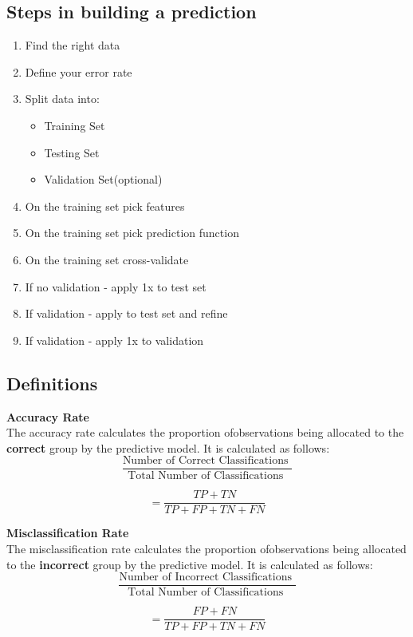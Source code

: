 \documentclass[caret-main.tex]{subfiles}
\begin{document}
\subsection*{Steps in building a prediction}
\begin{enumerate}
\item Find the right data
\item Define your error rate
\item Split data into:
\begin{itemize}
\item Training Set
\item Testing Set
\item Validation Set(optional)
\end{itemize}
\item On the training set pick features
\item On the training set pick prediction function
\item On the training set cross-validate

\item If no validation - apply 1x to test set
\item If validation - apply to test set and refine
\item If validation - apply 1x to validation
\end{enumerate}
\subsection{Definitions}
\textbf{Accuracy Rate}\\
The accuracy rate calculates the proportion ofobservations being allocated to the \textbf{correct} group by the predictive model. It is calculated as follows:
\[ \frac{
\mbox{Number of Correct Classifications }}{\mbox{Total Number of Classifications }} \]

\[ = \frac{TP + TN}{TP+FP+TN+FN}\]


\noindent \textbf{Misclassification Rate}\\
The misclassification rate calculates the proportion ofobservations being allocated to the \textbf{incorrect} group by the predictive model. It is calculated as follows:
\[ \frac{
\mbox{Number of Incorrect Classifications }}{\mbox{Total Number of Classifications }} \]

\[ = \frac{FP + FN}{TP+FP+TN+FN}\]
\newpage
\end{document}
